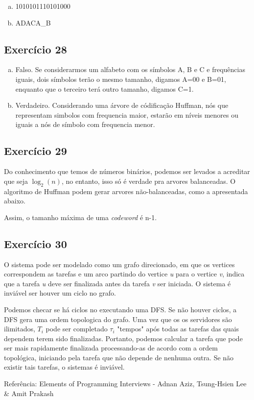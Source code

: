 \begin{enumerate}[a)]
    \item 1010101110101000
    \item ADACA\_B
\end{enumerate}


\subsection{Exercício 28}\label{sec:exer28}

\begin{enumerate}[a)]
    \item Falso. Se considerarmos um alfabeto com os símbolos A, B e C e frequências
    iguais, dois símbolos terão o mesmo tamanho, digamos A=00 e B=01, enquanto que
    o terceiro terá outro tamanho, digamos C=1.
    \item Verdadeiro. Considerando uma árvore de códificação Huffman, nós que
    representam simbolos com frequencia maior, estarão em níveis menores ou iguais
    a nós de símbolo com frequencia menor.
\end{enumerate}

\subsection{Exercício 29}\label{sec:exer29}

Do conhecimento que temos de números binários, podemos ser levados a acreditar que
seja $\log _2 \left( n \right)$, no entanto, isso só é verdade pra arvores balanceadas.
O algoritmo de Huffman podem gerar arvores não-balanceadas, como a apresentada abaixo.

Assim, o tamanho máxima de uma {\it codeword} é n-1.

\subsection{Exercício 30}\label{sec:exer30}

O sistema pode ser modelado como um grafo direcionado, em que os vertices correspondem
as tarefas e um arco partindo do vertice {\it u} para o vertice {\it v}, indica
que a tarefa {\it u} deve ser finalizada antes da tarefa {\it v} ser iniciada. O
sistema é inviável ser houver um ciclo no grafo.

Podemos checar se há ciclos no executando uma DFS. Se não houver ciclos, a DFS
gera uma ordem topologica do grafo. Uma vez que os os servidores são ilimitados,
$T_{i}$ pode ser completado $\tau_i$ "tempos" após todas as tarefas das quais
dependem terem sido finalizadas. Portanto, podemos calcular a tarefa que pode ser
mais rapidamente finalizada processando-as de acordo com a ordem topológica,
iniciando pela tarefa que não depende de nenhuma outra. Se não existir tais tarefas,
o sistemas é inviável.

Referência: Elements of Programming Interviews - Adnan Aziz, Tsung-Hsien Lee \& Amit Prakash
